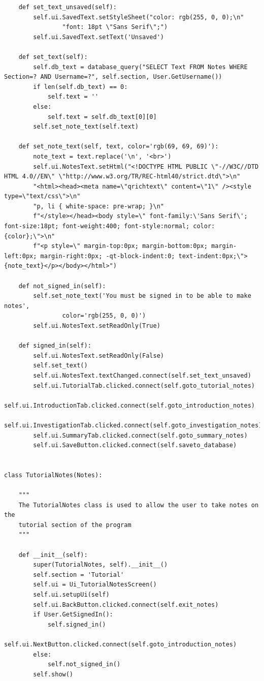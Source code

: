 \documentclass{article}
\begin{document}
\begin{lstlisting}
    def set_text_unsaved(self):
        self.ui.SavedText.setStyleSheet("color: rgb(255, 0, 0);\n"
                "font: 18pt \"Sans Serif\";")
        self.ui.SavedText.setText('Unsaved')

    def set_text(self):
        self.db_text = database_query("SELECT Text FROM Notes WHERE Section=? AND Username=?", self.section, User.GetUsername())
        if len(self.db_text) == 0:
            self.text = ''
        else:
            self.text = self.db_text[0][0]
        self.set_note_text(self.text)

    def set_note_text(self, text, color='rgb(69, 69, 69)'):
        note_text = text.replace('\n', '<br>')
        self.ui.NotesText.setHtml("<!DOCTYPE HTML PUBLIC \"-//W3C//DTD HTML 4.0//EN\" \"http://www.w3.org/TR/REC-html40/strict.dtd\">\n"
        "<html><head><meta name=\"qrichtext\" content=\"1\" /><style type=\"text/css\">\n"
        "p, li { white-space: pre-wrap; }\n"
        f"</style></head><body style=\" font-family:\'Sans Serif\'; font-size:18pt; font-weight:400; font-style:normal; color:{color};\">\n"
        f"<p style=\" margin-top:0px; margin-bottom:0px; margin-left:0px; margin-right:0px; -qt-block-indent:0; text-indent:0px;\">{note_text}</p></body></html>")

    def not_signed_in(self):
        self.set_note_text('You must be signed in to be able to make notes',
                color='rgb(255, 0, 0)')
        self.ui.NotesText.setReadOnly(True)

    def signed_in(self):
        self.ui.NotesText.setReadOnly(False)
        self.set_text()
        self.ui.NotesText.textChanged.connect(self.set_text_unsaved)
        self.ui.TutorialTab.clicked.connect(self.goto_tutorial_notes)
        self.ui.IntroductionTab.clicked.connect(self.goto_introduction_notes)
        self.ui.InvestigationTab.clicked.connect(self.goto_investigation_notes)
        self.ui.SummaryTab.clicked.connect(self.goto_summary_notes)
        self.ui.SaveButton.clicked.connect(self.saveto_database)


class TutorialNotes(Notes):

    """
    The TutorialNotes class is used to allow the user to take notes on the
    tutorial section of the program
    """

    def __init__(self):
        super(TutorialNotes, self).__init__()
        self.section = 'Tutorial'
        self.ui = Ui_TutorialNotesScreen()
        self.ui.setupUi(self)
        self.ui.BackButton.clicked.connect(self.exit_notes)
        if User.GetSignedIn():
            self.signed_in()
            self.ui.NextButton.clicked.connect(self.goto_introduction_notes)
        else:
            self.not_signed_in()
        self.show()



\end{lstlisting}
\end{document}
